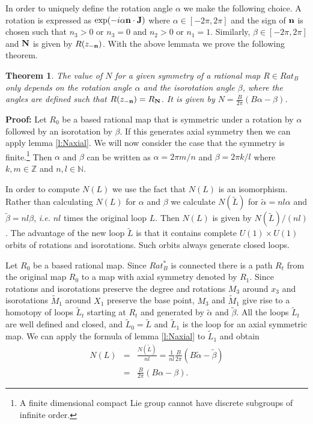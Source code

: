 \documentclass[a4paper,12pt]{article}
\newtheorem {theorem}{Theorem}[section]
\begin{document}
In order to uniquely define the rotation angle $\alpha$ we make the following 
choice. A rotation is expressed as 
%
$\exp (-i \alpha {\bf n} \cdot {\bf J})$
%
where $\alpha \in [- 2 \pi, 2 \pi]$ and the sign of  
${\bf n}$ is chosen such that $n_3 > 0$ or $n_3 = 0$ and $n_2 > 0$ or $n_1 = 
1$. Similarly, $\beta \in [-2 \pi, 2 \pi]$ and ${\bf N}$ is given by
$R(z_{-{\bf n}})$.
With the above lemmata we prove the following theorem.

\begin{theorem}
\label{t:N}
The value of $N$ for a given symmetry of a rational map $R \in Rat_B$ only 
depends on the rotation angle $\alpha$ and the isorotation angle $\beta$, where 
the angles are defined such that $R(z_{-{\bf n}}) = R_{{\bf N}}$. It 
is given by $N = \frac{B}{2 \pi} (B \alpha - \beta)$.
\end{theorem}
%
{\bf Proof:}
Let $R_0$ be a based rational map that is symmetric under a rotation by 
$\alpha$ followed by an isorotation by $\beta$. If this generates axial 
symmetry then we can apply lemma \ref{l:Naxial}.
We will now consider the case that 
the symmetry is finite.\footnote{A finite dimensional compact Lie group 
cannot have discrete subgroups of infinite order.}
%
Then $\alpha$ and $\beta$ can be written as $\alpha = 2 \pi m/n$ and 
$\beta = 2 \pi k/l$ where $k,m \in {\mathbb Z}$ and $n, l \in {\mathbb N}$.

In order to compute $N(L)$ we use the fact that $N(L)$ is an isomorphism. Rather 
than calculating $N(L)$ for $\alpha$ and $\beta$ we calculate $N({\tilde L})$ 
for ${\tilde \alpha} = n l \alpha$ and ${\tilde \beta} = n l \beta$, {\it i.e.} 
$n l$ times the original loop $L$. Then  $N(L)$ is given by 
$N({\tilde L})/(nl)$.
The advantage of the new loop ${\tilde L}$ is that it contains complete 
$U(1) \times U(1)$ orbits of rotations and isorotations. Such 
orbits always generate closed loops.

Let $R_0$ be a based rational map. Since $Rat^*_B$ is connected there is a 
path $R_t$ from the original map 
$R_0$ to a map with axial symmetry denoted by $R_1$. Since rotations and 
isorotations preserve the degree and rotations $M_3$ around $x_3$ and 
isorotations ${\tilde M}_1$ around $X_1$ preserve the base point, $M_3$ 
and ${\tilde M}_1$ give rise to a homotopy of loops 
${\tilde L}_t$ starting at $R_t$ 
and generated by ${\tilde \alpha}$ and ${\tilde \beta}$. All the 
loops ${\tilde L}_t$ are well defined and closed, and ${\tilde L}_0 = {\tilde 
L}$ and ${\tilde L}_1$ is the loop for an axial symmetric map.  
We can apply the formula of lemma \ref{l:Naxial} to ${\tilde L}_1$ and obtain
%
\begin{eqnarray}
\nonumber
N(L) &=& \frac{N({\tilde L})}{nl} = \frac{1}{nl} \frac{B}{2 \pi} (B {\tilde 
\alpha} 
- {\tilde \beta}) \\
\nonumber
 &=& \frac{B}{2 \pi} (B \alpha - \beta). 
\end{eqnarray}
\end{document}

